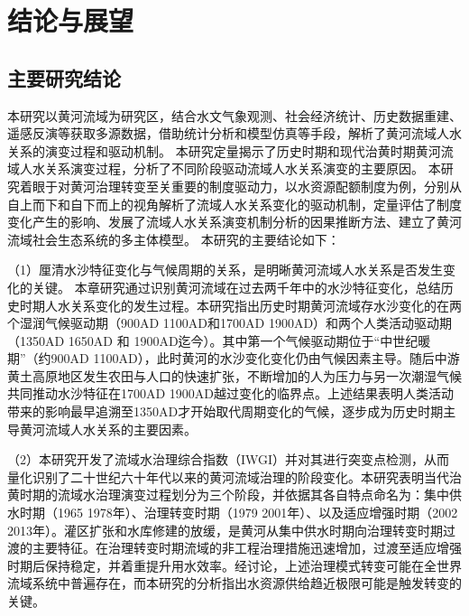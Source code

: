 \chapter{结论与展望}

\section{主要研究结论}

本研究以黄河流域为研究区，结合水文气象观测、社会经济统计、历史数据重建、遥感反演等获取多源数据，借助统计分析和模型仿真等手段，解析了黄河流域人\textendash{}水关系的演变过程和驱动机制。
本研究定量揭示了历史时期和现代治黄时期黄河流域人\textendash{}水关系演变过程，分析了不同阶段驱动流域人\textendash{}水关系演变的主要原因。
本研究着眼于对黄河治理转变至关重要的制度驱动力，以水资源配额制度为例，分别从自上而下和自下而上的视角解析了流域人\textendash{}水关系变化的驱动机制，定量评估了制度变化产生的影响、发展了流域人\textendash{}水关系演变机制分析的因果推断方法、建立了黄河流域社会\textendash{}生态系统的多主体模型。
本研究的主要结论如下：

（1）厘清水沙特征变化与气候周期的关系，是明晰黄河流域人\textendash{}水关系是否发生变化的关键。
本章研究通过识别黄河流域在过去两千年中的水沙特征变化，总结历史时期人\textendash{}水关系变化的发生过程。本研究指出历史时期黄河流域存水沙变化的在两个湿润气候驱动期（900AD \textendash{} 1100AD和1700AD \textendash{} 1900AD）和两个人类活动驱动期（1350AD \textendash{} 1650AD 和 1900AD迄今）。其中第一个气候驱动期位于“中世纪暖期”（约900AD \textendash{} 1100AD），此时黄河的水沙变化变化仍由气候因素主导。随后中游黄土高原地区发生农田与人口的快速扩张，不断增加的人为压力与另一次潮湿气候共同推动水沙特征在1700AD \textendash{} 1900AD越过变化的临界点。上述结果表明人类活动带来的影响最早追溯至1350AD才开始取代周期变化的气候，逐步成为历史时期主导黄河流域人\textendash{}水关系的主要因素。

（2）本研究开发了流域水治理综合指数（IWGI）并对其进行突变点检测，从而量化识别了二十世纪六十年代以来的黄河流域治理的阶段变化。本研究表明当代治黄时期的流域水治理演变过程划分为三个阶段，并依据其各自特点命名为：集中供水时期（1965 \textendash{} 1978年）、治理转变时期（1979 \textendash{} 2001年）、以及适应增强时期（2002 \textendash{} 2013年）。灌区扩张和水库修建的放缓，是黄河从集中供水时期向治理转变时期过渡的主要特征。在治理转变时期流域的非工程治理措施迅速增加，过渡至适应增强时期后保持稳定，并着重提升用水效率。经讨论，上述治理模式转变可能在全世界流域系统中普遍存在，而本研究的分析指出水资源供给趋近极限可能是触发转变的关键。

